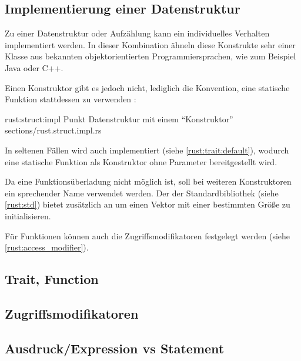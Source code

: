 \subsection{Implementierung einer Datenstruktur}

Zu einer Datenstruktur oder Aufzählung kann ein individuelles Verhalten implementiert werden.
In dieser Kombination ähneln diese Konstrukte sehr einer Klasse aus bekannten objektorientierten Programmiersprachen, wie zum Beispiel Java oder C++. 

Einen Konstruktor gibt es jedoch nicht, lediglich die Konvention, eine statische Funktion  stattdessen zu verwenden \cite{rust:book:constructors}:

\rustcinclude
	{rust:struct:impl}
	{Punkt Datenstruktur mit einem \enquote{Konstruktor}}
	{sections/rust.struct.impl.rs}
	
In seltenen Fällen wird auch  implementiert (siehe \autoref{rust:trait:default}), wodurch eine statische Funktion  als Konstruktor ohne Parameter bereitgestellt wird.

Da eine Funktionsüberladung nicht möglich ist, soll bei weiteren Konstruktoren ein sprechender Name verwendet werden.
Der  der Standardbibliothek (siehe \autoref{rust:std}) bietet zusätzlich  an um einen Vektor mit einer bestimmten Größe zu initialisieren.

Für Funktionen können auch die Zugriffsmodifikatoren festgelegt werden (siehe \autoref{rust:access_modifier}). 

\subsection{Trait, Function}
\label{rust:trait:default}


\subsection{Zugriffsmodifikatoren}
\label{rust:access_modifier}

\subsection{Ausdruck/Expression vs Statement}



